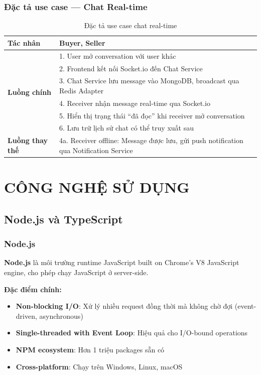 \documentclass[12pt]{extreport}
\begin{document}
\subsection{Đặc tả use case --- Chat Real-time}

\begin{table}[H]
\centering
\begin{tabular}{|p{4cm}|p{10cm}|}
\hline
\textbf{Tác nhân} & Buyer, Seller \\ \hline
\multirow{6}{*}{\textbf{Luồng chính}} &
1. User mở conversation với user khác \\ \cline{2-2}
& 2. Frontend kết nối Socket.io đến Chat Service \\ \cline{2-2}
& 3. Chat Service lưu message vào MongoDB, broadcast qua Redis Adapter \\ \cline{2-2}
& 4. Receiver nhận message real-time qua Socket.io \\ \cline{2-2}
& 5. Hiển thị trạng thái ``đã đọc'' khi receiver mở conversation \\ \cline{2-2}
& 6. Lưu trữ lịch sử chat có thể truy xuất sau \\ \hline
\textbf{Luồng thay thế} &
4a. Receiver offline: Message được lưu, gửi push notification qua Notification Service \\ \hline
\end{tabular}
\caption{Đặc tả use case chat real-time}
\label{tab:uc_chat}
\end{table}

\chapter{CÔNG NGHỆ SỬ DỤNG}

\section{Node.js và TypeScript}

\subsection{Node.js}

\textbf{Node.js} là môi trường runtime JavaScript built on Chrome's V8 JavaScript engine, cho phép chạy JavaScript ở server-side.

\textbf{Đặc điểm chính:}
\begin{itemize}
    \item \textbf{Non-blocking I/O}: Xử lý nhiều request đồng thời mà không chờ đợi (event-driven, asynchronous)
    \item \textbf{Single-threaded with Event Loop}: Hiệu quả cho I/O-bound operations
    \item \textbf{NPM ecosystem}: Hơn 1 triệu packages sẵn có
    \item \textbf{Cross-platform}: Chạy trên Windows, Linux, macOS
\end{itemize}
\end{document}
